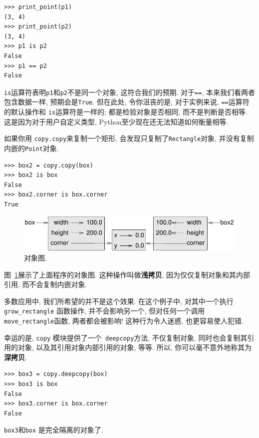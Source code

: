 \documentclass[10pt]{book}
\begin{document}
\begin{verbatim}
>>> print_point(p1)
(3, 4)
>>> print_point(p2)
(3, 4)
>>> p1 is p2
False
>>> p1 == p2
False
\end{verbatim}
%

{\tt is}运算符表明{\tt p1}和{\tt p2}不是同一个对象, 这符合我们的预期. 
对于{\tt ==}, 本来我们看两者包含数据一样, 预期会是{\tt True}. 
但在此处, 令你沮丧的是, 对于实例来说, {\tt ==}运算符的默认操作和
{\tt is}运算符是一样的; 都是检验对象是否相同, 而不是判断是否相等.
这是因为对于用户自定义类型, Python至少现在还无法知道如何衡量相等.

如果你用 {\tt copy.copy}来复制一个矩形, 
会发现只复制了{\tt Rectangle}对象, 并没有复制内嵌的{\tt Point}对象.

\begin{verbatim}
>>> box2 = copy.copy(box)
>>> box2 is box
False
>>> box2.corner is box.corner
True
\end{verbatim}

\begin{figure}
\centerline
{\includegraphics[scale=0.8]{figs/rectangle2.pdf}}
\caption{对象图.}
\label{fig.rectangle2}
\end{figure}

图~\ref{fig.rectangle2}展示了上面程序的对象图.
这种操作叫做{\bf 浅拷贝}, 因为仅仅复制对象和其内部引用, 而不会复制内嵌对象. 

多数应用中, 我们所希望的并不是这个效果. 
在这个例子中, 对其中一个执行 \verb"grow_rectangle" 函数操作, 
并不会影响另一个, 但对任何一个调用 \verb"move_rectangle"函数, 两者都会被影响!
这种行为令人迷惑, 也更容易使人犯错. 

幸运的是,  {\tt copy} 模块提供了一个{\tt
deepcopy}方法, 不仅复制对象, 同时也会复制其引用的对象, 
以及其引用对象内部引用的对象, 等等. 
所以, 你可以毫不意外地称其为{\bf 深拷贝}. 

\begin{verbatim}
>>> box3 = copy.deepcopy(box)
>>> box3 is box
False
>>> box3.corner is box.corner
False
\end{verbatim}
%
{\tt box3}和{\tt box} 是完全隔离的对象了. 
\end{document}
